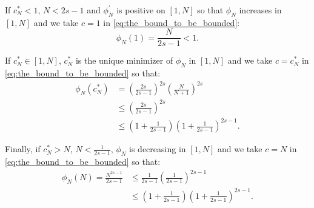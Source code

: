 \documentclass[twoside,11pt]{book}
\newcommand{\pc}[1]{\textcolor{blue}{#1}}
\newcommand{\rb}[1]{\textcolor{magenta}{#1}}
\begin{document}
If $c_{N}^{*}< 1$, $N < 2s-1$ and $\phi_{N}^{'}$ is positive on $[1,N]$ so that $\phi_{N}$ increases in $[1,N]$ and we take $c = 1$ in \eqref{eq:the_bound_to_be_bounded}:
\begin{equation}
\phi_{N}(1) = \frac{N}{2s-1} < 1.
\end{equation}

If $c_{N}^{*} \in [1,N]$, $c_{N}^{*}$ is the unique minimizer of $\phi_{N}$ in $[1,N]$ and we take $c = c_{N}^{*}$ in \eqref{eq:the_bound_to_be_bounded} so that: 
\begin{align}
\phi_{N}(c_{N}^{*}) &= \left(\frac{2s}{2s-1}\right)^{2s} \left(\frac{N}{N+1}\right)^{2s}\\
& \leq \left(\frac{2s}{2s-1}\right)^{2s}\\
& \leq \left(1+\frac{1}{2s-1}\right)\left(1+\frac{1}{2s-1}\right)^{2s-1}.
\label{e:useful_for_limits_as_well}
\end{align}

Finally, if $c_{N}^{*} > N$, $N < \frac{1}{2s-1}$, $\phi_{N}$ is decreasing in $[1,N]$ and we take $c = N$ in \eqref{eq:the_bound_to_be_bounded} so that:
\begin{align}
\phi_{N}(N) = \frac{N^{2s-1}}{2s-1} &\leq \frac{1}{2s-1} \left(\frac{1}{2s-1}\right)^{2s-1} \\
&\leq \left(1+\frac{1}{2s-1}\right) \left(1+\frac{1}{2s-1}\right)^{2s-1}. \label{e:useful_for_limits}
\end{align}





\end{document}

